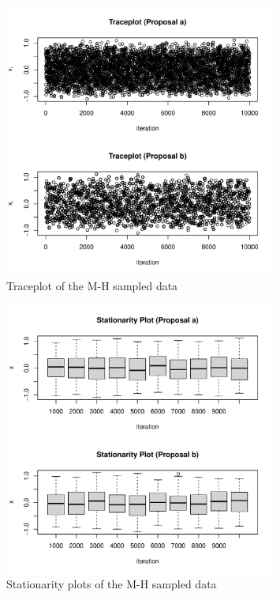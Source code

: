 \documentclass[11pt]{article}
\begin{document}
\begin{figure}[htpb]
	\centering
	\includegraphics[width=0.8\textwidth]{Ast3-Q5-traceplots.pdf}
	\caption{Traceplot of the M-H sampled data}
	\label{fig:Ast3-Q5-traceplots-pdf}
\end{figure}

\begin{figure}[htpb]
	\centering
	\includegraphics[width=0.8\textwidth]{Ast3-Q5-stationarity-plot.pdf}
	\caption{Stationarity plots of the M-H sampled data}
	\label{fig:Ast3-Q5-stationarity-plot-pdf}
\end{figure}
\end{document}
